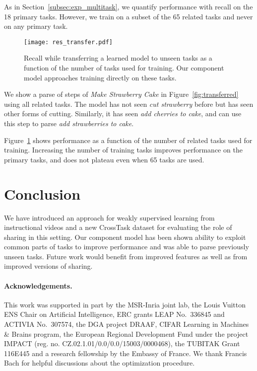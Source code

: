 \documentclass[10pt,twocolumn,letterpaper]{article}
\begin{document}
 As in Section~\ref{subsec:exp_multitask},
we quantify performance with recall on the 18 primary tasks. However,
we train on a subset of the 65 related tasks and never on any primary
task.

\begin{figure}[t]
\centering
\texttt{[image: res\_transfer.pdf]}
\caption{Recall while transferring a learned model to unseen tasks as a function of the number
of tasks used for training. Our component model approaches training directly on these tasks. }
\label{fig:res_transfer}
\end{figure}


 We show a parse of steps of {\it Make Strawberry Cake}
in Figure~\ref{fig:transferred} using all related tasks. The model has not seen {\it cut strawberry} before
but has seen other forms of cutting. Similarly, it has seen {\it add cherries
to cake}, and can use this step to parse {\it add strawberries to cake}.

 Figure~\ref{fig:res_transfer} shows performance as a function
of the number of related tasks used for training. Increasing the number of training tasks
improves performance on the primary tasks, and does not plateau
even when 65 tasks are used.

\section{Conclusion}
\label{sec:conclusions}

We have introduced an approach for weakly supervised learning
from instructional videos and a new CrossTask dataset for evaluating the role of sharing in this
setting. Our component model has been shown ability to exploit common parts of tasks
to improve performance and was able to parse previously unseen tasks.
Future work
would benefit from improved features as well as from improved versions of sharing.

\paragraph{Acknowledgements.} This work was supported in part by the MSR-Inria joint lab, the Louis Vuitton ENS Chair on Artificial Intelligence, ERC grants LEAP No.~336845 and ACTIVIA No.~307574, the DGA project DRAAF, CIFAR Learning in Machines \& Brains program, the European Regional Development Fund under the project IMPACT (reg. no. CZ.02.1.01/0.0/0.0/15003/0000468), the TUBITAK Grant 116E445 and a research fellowship by the Embassy of France.
We thank Francis Bach for helpful discussions about the optimization procedure.
\end{document}
